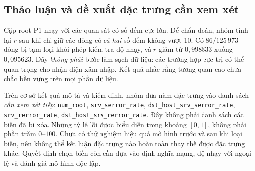 \documentclass[../main.tex]{subfiles}
\begin{document}
\subsection{Thảo luận và đề xuất đặc trưng cần xem xét}
Cặp root P1 nhạy với các quan sát có số đếm cực lớn. Để chẩn đoán,
nhóm tính lại $r$ sau khi chỉ giữ các dòng có \emph{cả hai} số đếm
không vượt 10. Có $86/125\,973$ dòng bị tạm loại khỏi phép kiểm tra độ nhạy,
và $r$ giảm từ $0{,}998833$ xuống $0{,}095623$. Đây \emph{không phải}
bước làm sạch dữ liệu: các trường hợp cực trị có thể quan trọng cho nhận diện
xâm nhập. Kết quả nhắc rằng tương quan cao chưa chắc bền vững trên mọi
phần dữ liệu.

Trên cơ sở kết quả mô tả và kiểm định, nhóm đưa năm đặc trưng vào danh sách
\emph{cần xem xét tiếp}: \nolinkurl{num_root}, \nolinkurl{srv_serror_rate},
\nolinkurl{dst_host_srv_serror_rate}, \nolinkurl{srv_rerror_rate},
\nolinkurl{dst_host_srv_rerror_rate}. Đây không phải danh sách các biến đã bị
xóa. Những tỷ lệ lỗi được biểu diễn trong khoảng $[0,1]$, không phải
phần trăm $0$--$100$. Chưa có thử nghiệm hiệu quả mô hình trước và sau khi
loại biến, nên không thể kết luận đặc trưng nào hoàn toàn thay thế được
đặc trưng khác. Quyết định chọn biến còn cần dựa vào định nghĩa mạng,
độ nhạy với ngoại lệ và đánh giá mô hình độc lập.
\end{document}
